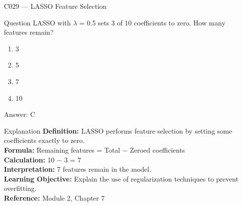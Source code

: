 \documentclass[aspectratio=169,8pt]{beamer}
\begin{document}
	\begin{frame}{C029 --- LASSO Feature Selection}
		\begin{block}{Question}
			LASSO with $\lambda$ = 0.5 sets 3 of 10 coefficients to zero. How many features remain?
			\begin{enumerate}
				\item 3
				\item 5
				\item 7
				\item 10
			\end{enumerate}
		\end{block}
		\begin{exampleblock}{Answer: C}\end{exampleblock}
		\begin{block}{Explanation}
			\textbf{Definition:} LASSO performs feature selection by setting some coefficients exactly to zero.\\
			\textbf{Formula:} Remaining features = Total $-$ Zeroed coefficients\\
			\textbf{Calculation:} 10 $-$ 3 = 7\\
			\textbf{Interpretation:} 7 features remain in the model.\\
			\textbf{Learning Objective:} Explain the use of regularization techniques to prevent overfitting.\\
			\textbf{Reference:} Module 2, Chapter 7
		\end{block}
	\end{frame}
	
\end{document}
